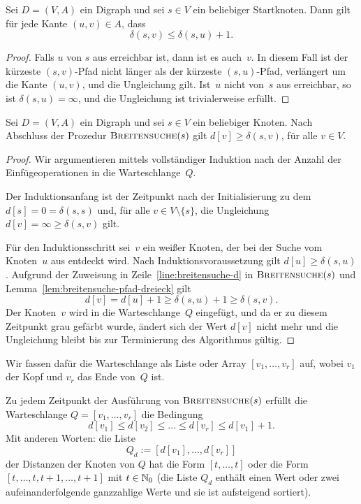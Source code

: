 \begin{lem}
\label{lem:breitensuche-pfad-dreieck}
Sei $D=(V,A)$ ein Digraph und sei $s \in V$ ein beliebiger Startknoten.
Dann gilt für jede Kante $(u,v) \in A$, dass
\[
\delta(s,v) \leq \delta(s,u) + 1.
\]
\end{lem}

\begin{proof}
Falls $u$ von $s$ aus erreichbar ist, dann ist es auch~$v$.
In diesem Fall ist der kürzeste $(s,v)$-Pfad nicht länger als der kürzeste $(s,u)$-Pfad, verlängert um die Kante $(u,v)$, und die Ungleichung gilt.
Ist~$u$ nicht von~$s$ aus erreichbar, so ist $\delta(s,u)=\infty$, und die Ungleichung ist trivialerweise erfüllt.
\end{proof}

\begin{lem}
\label{lem:breitensuche-d-geq-delta}
Sei $D=(V,A)$ ein Digraph und sei $s \in V$ ein beliebiger Knoten.
Nach Abschluss der Prozedur $\mathop{\text{\textsc{Breitensuche}}}(s)$ gilt $d[v] \geq \delta(s,v)$, für alle $v \in V$.
\end{lem}

\begin{proof}
Wir argumentieren mittels vollständiger Induktion nach der Anzahl der Ein\-füge\-operationen in die Warteschlange~$Q$.

Der Induktionsanfang ist der Zeitpunkt nach der Initialisierung zu dem $d[s]=0=\delta(s,s)$ und, für alle $v \in V \setminus \{s\}$, die Ungleichung $d[v]=\infty\geq\delta(s,v)$ gilt.

Für den Induktionsschritt sei~$v$ ein weißer Knoten, der bei der Suche vom Knoten~$u$ aus entdeckt wird.
Nach Induktionsvoraussetzung gilt $d[u] \geq \delta(s,u)$.
Aufgrund der Zuweisung in Zeile~\ref{line:breitensuche-d} in $\mathop{\text{\textsc{Breitensuche}}}(s)$ und Lemma~\ref{lem:breitensuche-pfad-dreieck} gilt
\[
d[v] = d[u] + 1 \geq \delta(s,u) + 1 \geq \delta(s,v).
\]
Der Knoten~$v$ wird in die Warteschlange~$Q$ eingefügt, und da er zu diesem Zeitpunkt grau gefärbt wurde, ändert sich der Wert $d[v]$ nicht mehr und die Ungleichung bleibt bis zur Terminierung des Algorithmus gültig.
\end{proof}

\begin{bem} 
Wir fassen dafür die Warteschlange als Liste oder Array $[v_1,\ldots,v_r]$ auf, wobei $v_1$ der Kopf und $v_r$ das Ende von~$Q$ ist.
\end{bem} 

\begin{lem}
\label{lem:breitensuche-warteschlange-monotonie}
Zu jedem Zeitpunkt der Ausführung von $\mathop{\text{\textsc{Breitensuche}}}(s)$ erfüllt die Warteschlange $Q=[v_1,\ldots,v_r]$ die Bedingung
\[
d[v_1] \leq d[v_2] \leq \ldots \leq d[v_r] \leq d[v_1] + 1.
\]
Mit anderen Worten: die Liste 
\[
	Q_d:=[d[v_1],\ldots,d[v_r]]
\] der Distanzen der Knoten von $Q$ hat die Form $[t,\ldots,t]$ oder die Form $[t,\ldots,t,t+1,\ldots,t+1]$ mit $t \in \mathbb{N}_0$ (die Liste $Q_d$ enthält einen Wert oder zwei aufeinanderfolgende ganzzahlige Werte und sie ist aufsteigend sortiert). 
\end{lem}

